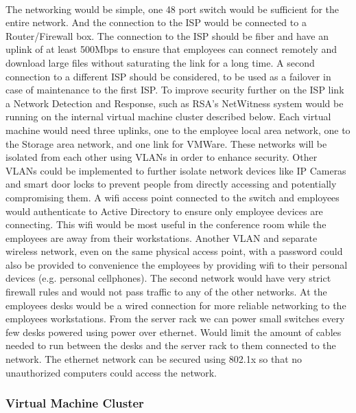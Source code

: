 \documentclass{article}
\begin{document}
\paragraph{}
The networking would be simple, one 48 port switch would be sufficient for the entire network.
And the connection to the ISP would be connected to a Router/Firewall box.
The connection to the ISP should be fiber and have an uplink of at least 500Mbps to ensure that employees can connect remotely and download large files without saturating the link for a long time.
A second connection to a different ISP should be considered, to be used as a failover in case of maintenance to the first ISP.
To improve security further on the ISP link a Network Detection and Response, such as RSA's NetWitness system would be running on the internal virtual machine cluster described below.
Each virtual machine would need three uplinks, one to the employee local area network, one to the Storage area network, and one link for VMWare.
These networks will be isolated from each other using VLANs in order to enhance security.
Other VLANs could be implemented to further isolate network devices like IP Cameras and smart door locks to prevent people from directly accessing and potentially compromising them.
A wifi access point connected to the switch and employees would authenticate to Active Directory to ensure only employee devices are connecting.
This wifi would be most useful in the conference room while the employees are away from their workstations.
Another VLAN and separate wireless network, even on the same physical access point, with a password could also be provided to convenience the employees by providing wifi to their personal devices (e.g. personal cellphones).
The second network would have very strict firewall rules and would not pass traffic to any of the other networks.
At the employees desks would be a wired connection for more reliable networking to the employees workstations. 
From the server rack we can power small switches every few desks powered using power over ethernet.
Would limit the amount of cables needed to run between the desks and the server rack to them connected to the network.
The ethernet network can be secured using 802.1x so that no unauthorized computers could access the network. 

\subsubsection{Virtual Machine Cluster}
\end{document}
